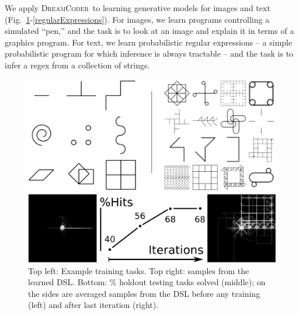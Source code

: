 \documentclass{article}
\newcommand{\system}{\textsc{DreamCoder}~}
\begin{document}
We apply \system to learning generative models for images and text (Fig.~\ref{geomCompiled}-\ref{regularExpressions}).
For images, we learn programs controlling a simulated ``pen,''
and the task is to look at an image and explain it in terms of a graphics program.
For text, we learn probabilistic regular expressions -- a simple probabilistic program for which inference is always tractable -- and the task is to
infer a regex from a collection of strings.
\begin{figure}[t]
  \includegraphics[width=\columnwidth]{figures/geomCompiled.eps} 
  \caption{
  Top left: Example training tasks. Top right: samples from the learned DSL.
 Bottom: \% holdout testing tasks solved (middle); on the sides are averaged samples from the DSL
  before any training (left) and after last iteration (right).}\label{geomCompiled}

  \end{figure}
\end{document}
